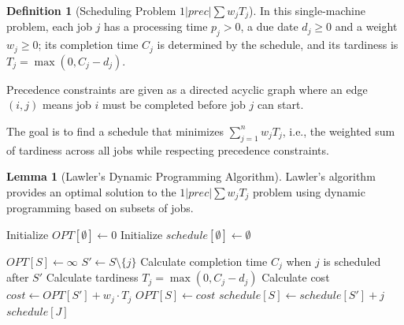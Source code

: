 \documentclass{article}
\theoremstyle{definition}
\newtheorem{lemma}{Lemma}
\newtheorem{definition}{Definition}
\begin{document}
\begin{definition}[Scheduling Problem $1|prec|\sum w_jT_j$]
In this single-machine problem, each job $j$ has a processing time $p_j > 0$, a due date $d_j \geq 0$ and a weight $w_j \geq 0$; its completion time $C_j$ is determined by the schedule, and its tardiness is $T_j = \max(0, C_j - d_j)$.

Precedence constraints are given as a directed acyclic graph where an edge $(i, j)$ means job $i$ must be completed before job $j$ can start.

The goal is to find a schedule that minimizes $\sum_{j=1}^{n} w_jT_j$, i.e., the weighted sum of tardiness across all jobs while respecting precedence constraints.
\end{definition}

\begin{lemma}[Lawler's Dynamic Programming Algorithm]
Lawler's algorithm provides an optimal solution to the $1|prec|\sum w_jT_j$ problem using dynamic programming based on subsets of jobs.

\begin{algorithm}
\caption{Lawler's Dynamic Programming Algorithm}
\begin{algorithmic}[1]
    \State Initialize $OPT[\emptyset] \gets 0$ 
    \State Initialize $schedule[\emptyset] \gets \emptyset$ 
    
     
            \State $OPT[S] \gets \infty$ 
                \State $S' \gets S \setminus \{j\}$ 
                \State Calculate completion time $C_j$ when $j$ is scheduled after $S'$
                \State Calculate tardiness $T_j = \max(0, C_j - d_j)$
                \State Calculate cost $cost \gets OPT[S'] + w_j \cdot T_j$
                    \State $OPT[S] \gets cost$ 
                    \State $schedule[S] \gets schedule[S'] + j$ 
                \EndIf
            \EndFor
        \EndFor
    \EndFor
    \State \Return $schedule[J]$ 
\EndProcedure
\end{algorithmic}
\end{algorithm}


\end{lemma}
\end{document}
